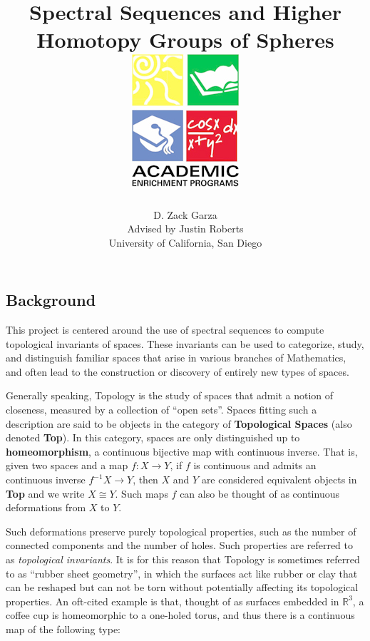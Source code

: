 \documentclass[a0,final]{a0poster}
\title{Spectral Sequences and Higher Homotopy Groups of Spheres\hspace*{10cm}
\includegraphics[]{aep-logo-2}}
\author{D. Zack Garza\\
Advised by Justin Roberts \\
University of California, San Diego }
\begin{document}
\hspace{-3cm}								%
\colorbox{boxcol}{							%
\begin{minipage}{1189mm}					%
\maketitle
\end{minipage}}
\vspace{1cm}

\begin{multicols}{3}							%
\raggedcolumns							%

\section*{Background}
This project is centered around the use of spectral sequences to compute topological invariants of spaces. These invariants can be used to categorize, study, and distinguish familiar spaces that arise in various branches of Mathematics, and often lead to the construction or discovery of entirely new types of spaces.

Generally speaking, Topology is the study of spaces that admit a notion of closeness, measured by a collection of ``open sets''. Spaces fitting such a description are said to be objects in the category of \textbf{Topological Spaces} (also denoted \textbf{Top}). In this category, spaces are only distinguished up to \textbf{homeomorphism}, a continuous bijective map with continuous inverse. That is, given two spaces and a map $f: X \to Y$, if $f$ is continuous and admits an continuous inverse $f^{-1} X \to Y$, then $X$ and $Y$ are considered equivalent objects in \textbf{Top} and we write $X \cong Y$. Such maps $f$ can also be thought of as continuous deformations from $X$ to $Y$.

Such deformations preserve purely topological properties, such as the number of connected components and the number of holes. Such properties are referred to as \textit{topological invariants}. It is for this reason that Topology is sometimes referred to as ``rubber sheet geometry'', in which the surfaces act like rubber or clay that can be reshaped but can not be torn without potentially affecting its topological properties. An oft-cited example is that, thought of as surfaces embedded in $\mathbb{R}^3$, a coffee cup is homeomorphic to a one-holed torus, and thus there is a continuous map of the following type:


\end{multicols}
\end{document}
